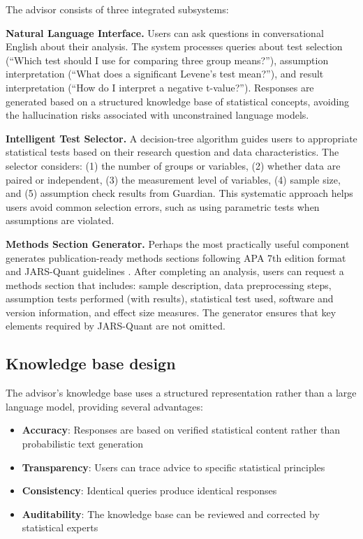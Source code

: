 \documentclass[article]{jss}
\begin{document}
The advisor consists of three integrated subsystems:

\textbf{Natural Language Interface.} Users can ask questions in conversational English about their analysis. The system processes queries about test selection (``Which test should I use for comparing three group means?''), assumption interpretation (``What does a significant Levene's test mean?''), and result interpretation (``How do I interpret a negative t-value?''). Responses are generated based on a structured knowledge base of statistical concepts, avoiding the hallucination risks associated with unconstrained language models.

\textbf{Intelligent Test Selector.} A decision-tree algorithm guides users to appropriate statistical tests based on their research question and data characteristics. The selector considers: (1) the number of groups or variables, (2) whether data are paired or independent, (3) the measurement level of variables, (4) sample size, and (5) assumption check results from Guardian. This systematic approach helps users avoid common selection errors, such as using parametric tests when assumptions are violated.

\textbf{Methods Section Generator.} Perhaps the most practically useful component generates publication-ready methods sections following APA 7th edition format and JARS-Quant guidelines \citep{appelbaum2018jars}. After completing an analysis, users can request a methods section that includes: sample description, data preprocessing steps, assumption tests performed (with results), statistical test used, software and version information, and effect size measures. The generator ensures that key elements required by JARS-Quant are not omitted.

\subsection{Knowledge base design}

The advisor's knowledge base uses a structured representation rather than a large language model, providing several advantages:

\begin{itemize}
\item \textbf{Accuracy}: Responses are based on verified statistical content rather than probabilistic text generation
\item \textbf{Transparency}: Users can trace advice to specific statistical principles
\item \textbf{Consistency}: Identical queries produce identical responses
\item \textbf{Auditability}: The knowledge base can be reviewed and corrected by statistical experts
\end{itemize}
\end{document}
